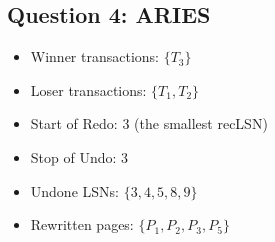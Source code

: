\documentclass[a4paper]{article}
\begin{document}
\subsection{Question 4: ARIES}

\begin{itemize}
    \item Winner transactions: $\{T_3\}$
    \item Loser transactions: $\{T_1, T_2\}$
    \item Start of Redo: 3 (the smallest recLSN)
    \item Stop of Undo: 3
    \item Undone LSNs: $\{3, 4, 5, 8, 9\}$
    \item Rewritten pages: $\{P_1, P_2, P_3, P_5\}$
\end{itemize}
\end{document}
